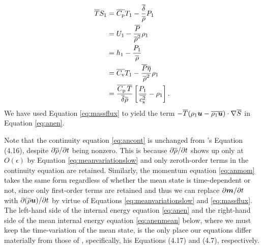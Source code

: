 \documentclass[12pt]{article}
\begin{document}
  \begin{subequations}\label{eq:anfirstlawpert}
  \begin{align}
  	\overline{T} S_1 &= \overline{C_{\rm{p}}} T_1 - \frac{\overline{\delta}}{\overline{\rho}} P_1\label{eq:anfirstlawperttmpprs}\\
  	&= U_1 - \frac{\overline{P}}{\overline{\rho}^2}\rho_1 \label{eq:anfirstlawpertinterho}\\
  	&= h_1 - \frac{P_1}{\overline{\rho}}\label{eq:anfirstlawpertenthprs}\\
  	&= \overline{C_{\rm{v}}} T_1 - \frac{\overline{P}\overline{\eta}}{\overline{\rho}^2}\rho_1\label{eq:anfirstlawperttmprho}\\		
  	&= \frac{\overline{C_{\rm{p}}}\, \overline{T}}{\overline{\delta}\overline{\rho}}\left[\frac{P_1}{\overline{c_{\rm s}^2}}-\rho_1\right].\label{eq:anfirstlawpertprsrho}
  \end{align}
  \end{subequations}
  We have used Equation \eqref{eq:massflux} to yield the term $- \overline{T}(\rho_1\bm{u}-\overline{\rho_1\bm{u}})\cdot\nabla\overline{S}$ in Equation \eqref{eq:anen}. 
  
  Note that the continuity equation \eqref{eq:ancont} is unchanged from \citet{Gough1969}'s Equation (4.16), despite $\partial\overline{\rho}/\partial t$ being nonzero. This is because $\partial\overline{\rho}/\partial t$ shows up only at $O(\epsilon)$ by Equation \eqref{eq:meanvariationslow} and only zeroth-order terms in the continuity equation are retained. Similarly, the momentum equation \eqref{eq:anmom} takes the same form regardless of whether the mean state is time-dependent or not, since only first-order terms are retained and thus we can replace $\partial\bm{m}/\partial t$ with $\partial(\overline{\rho}\bm{u})/\partial t$ by virtue of Equations \eqref{eq:meanvariationslow} and \eqref{eq:massflux}. The left-hand side of the internal energy equation \eqref{eq:anen} and the right-hand side of the mean internal energy equation \eqref{eq:anenmean} below, where we must keep the time-variation of the mean state, is the only place our equations differ materially from those of \citet{Gough1969}, specifically, his Equations (4.17) and (4.7), respectively.
  
\end{document}

